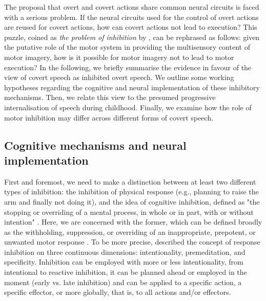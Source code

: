 \documentclass[utf8]{template/frontiersSCNS} %
\begin{document}
The proposal that overt and covert actions share common neural circuits is faced with a serious problem. If the neural circuits used for the control of overt actions are reused for covert actions, how can covert actions not lead to execution? This puzzle, coined as \textit{the problem of inhibition} by \cite{jeannerod_neural_2001}, can be rephrased as follows: given the putative role of the motor system in providing the multisensory content of motor imagery, how is it possible for motor imagery not to lead to motor execution? In the following, we briefly summarise the evidence in favour of the view of covert speech as inhibited overt speech. We outline some working hypotheses regarding the cognitive and neural implementation of these inhibitory mechanisms. Then, we relate this view to the presumed progressive internalisation of speech during childhood. Finally, we examine how the role of motor inhibition may differ across different forms of covert speech.

\subsection{Cognitive mechanisms and neural implementation}

First and foremost, we need to make a distinction between at least two different types of inhibition: the inhibition of physical response (e.g., planning to raise the arm and finally not doing it), and the idea of cognitive inhibition, defined as "the stopping or overriding of a mental process, in whole or in part, with or without intention" \citep{gorfein_concept_2007}. Here, we are concerned with the former, which can be defined broadly as the withholding, suppression, or overriding of an inappropriate, prepotent, or unwanted motor response \citep{aron_neural_2007, oshea_go_2018}. To be more precise, \cite{ridderinkhof_dont_2014} described the concept of response inhibition on three continuous dimensions: intentionality, premeditation, and specificity. Inhibition can be employed with more or less intentionality, from intentional to reactive inhibition, it can be planned ahead or employed in the moment (early vs. late inhibition) and can be applied to a specific action, a specific effector, or more globally, that is, to all actions and/or effectors.
\end{document}
